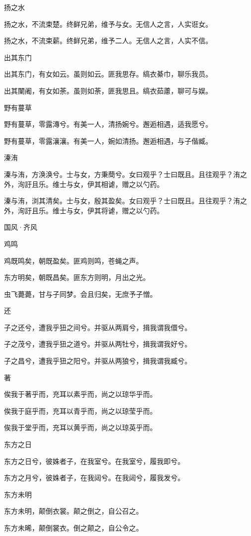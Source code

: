 扬之水

扬之水，不流束楚。终鲜兄弟，维予与女。无信人之言，人实诳女。

扬之水，不流束薪。终鲜兄弟，维予二人。无信人之言，人实不信。

出其东门

出其东门，有女如云。虽则如云。匪我思存。缟衣綦巾，聊乐我员。

出其闉阇，有女如荼。虽则如荼，匪我思且。缟衣茹藘，聊可与娱。

野有蔓草

野有蔓草，零露漙兮。有美一人，清扬婉兮。邂逅相遇，适我愿兮。

野有蔓草，零露瀼瀼。有美一人，婉如清扬。邂逅相遇，与子偕臧。

溱洧

溱与洧，方涣涣兮。士与女，方秉蕳兮。女曰观乎？士曰既且。且往观乎？洧之外，洵訏且乐。维士与女，伊其相谑，赠之以勺药。

溱与洧，浏其清矣。士与女，殷其盈矣。女曰观乎？士曰既且。且往观乎？洧之外，洵訏且乐。维士与女，伊其将谑，赠之以勺药。




国风·齐风


鸡鸣

鸡既鸣矣，朝既盈矣。匪鸡则鸣，苍蝇之声。

东方明矣，朝既昌矣。匪东方则明，月出之光。

虫飞薨薨，甘与子同梦。会且归矣，无庶予子憎。

还

子之还兮，遭我乎狃之间兮。并驱从两肩兮，揖我谓我儇兮。

子之茂兮，遭我乎狃之道兮。并驱从两牡兮，揖我谓我好兮。

子之昌兮，遭我乎狃之阳兮。并驱从两狼兮，揖我谓我臧兮。

著

俟我于著乎而，充耳以素乎而，尚之以琼华乎而。

俟我于庭乎而，充耳以青乎而，尚之以琼莹乎而。

俟我于堂乎而，充耳以黄乎而，尚之以琼英乎而。

东方之日

东方之日兮，彼姝者子，在我室兮。在我室兮，履我即兮。

东方之月兮，彼姝者子，在我闼兮。在我闼兮，履我发兮。

东方未明

东方未明，颠倒衣裳。颠之倒之，自公召之。

东方未晞，颠倒裳衣。倒之颠之，自公令之。

